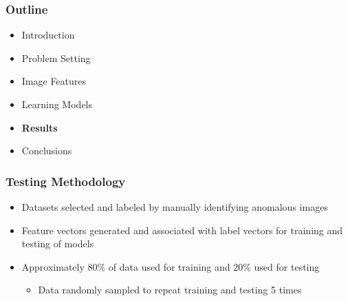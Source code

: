 \documentclass{beamer}
\begin{document}
\begin{frame}
\frametitle{Outline}
\begin{itemize}
  \item Introduction
  \item\vspace{0.5cm}Problem Setting
  \item\vspace{0.5cm}Image Features
  \item \vspace{0.5cm}Learning Models
  \item \vspace{0.5cm} \textbf{Results}
  \item \vspace{0.5cm}Conclusions
\end{itemize}
\end{frame}

\begin{frame}
\frametitle{Testing Methodology}
\begin{itemize}
  \item Datasets selected and labeled by manually identifying anomalous images
  \item Feature vectors generated and associated with label vectors for training and testing of models
  \item Approximately 80\% of data used for training and 20\% used for testing
  \begin{itemize}
    \item Data randomly sampled to repeat training and testing 5 times
  \end{itemize}
\end{itemize}
\end{frame}
\end{document}
